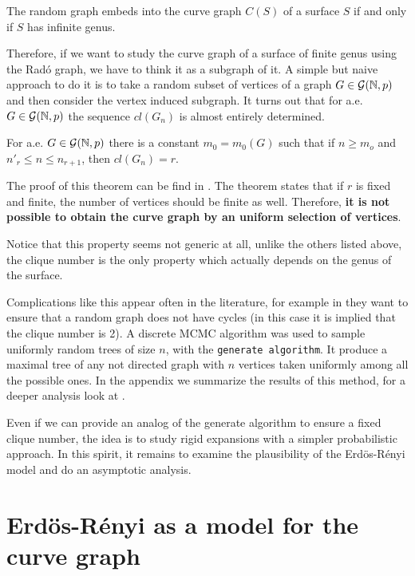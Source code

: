 \begin{theorem}
The random graph embeds into the curve graph $C(S)$ of a surface $S$ if and only if $S$ has infinite genus.
\end{theorem}

Therefore, if we want to study the curve graph of a surface of finite genus using the Radó graph, we have to think it as a subgraph of it. A simple but naive approach to do it is to take a random subset of vertices of a graph $G\in \mathcal{G}(\mathbb{N}, p)$ and then consider the vertex induced subgraph. It turns out that for a.e. $G\in \mathcal{G}(\mathbb{N}, p)$ the sequence $cl(G_n)$ is almost entirely determined.

\begin{theorem}
For a.e. $G \in \mathcal{G}(\mathbb{N},p)$ there is a constant $m_0 = m_{0}(G)$ such that if $n \geq m_o$ and $n'_{r} \leq n \leq n_{r+1}$, then $cl(G_{n}) = r$.
\end{theorem}

The proof of this theorem can be find in \cite[Bollobás p.~284]{Bollobas}. The theorem states that if $r$ is fixed and finite, the number of vertices should be finite as well. Therefore, \textbf{it is not possible to obtain the curve graph by an uniform selection of vertices}. 

Notice that this property seems not generic at all, unlike the others listed above, the clique number is the only property which actually depends on the genus of the surface.

Complications like this appear often in the literature, for example in \cite{Alcazar15} they want to ensure that a random graph does not have cycles (in this case it is implied that the clique number is 2). A discrete MCMC algorithm was used to sample uniformly random trees of size $n$, with the \texttt{generate algorithm}. It produce a maximal tree of any not directed graph with $n$ vertices taken uniformly among all the possible ones. In the appendix we summarize the results of this method, for a deeper analysis look at \cite{Broder89}.

Even if we can provide an analog of the generate algorithm to ensure a fixed clique number, the idea is to study rigid expansions with a simpler probabilistic approach. In this spirit, it remains to examine the plausibility of the Erdös-Rényi model and do an asymptotic analysis.

\section{Erdös-Rényi as a model for the curve graph}

